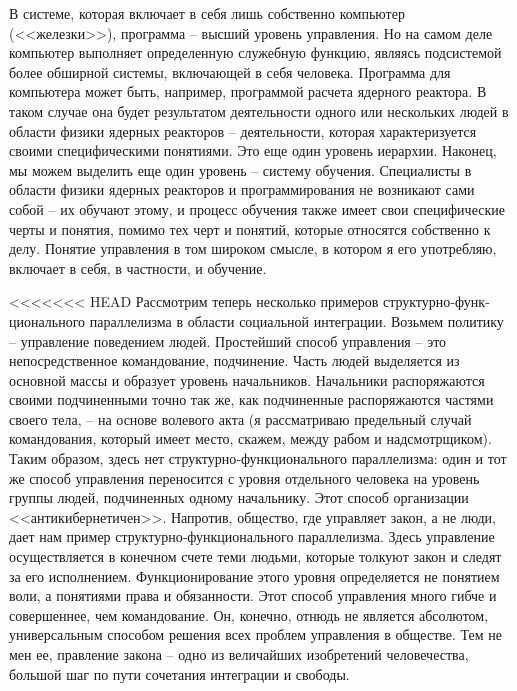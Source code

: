 \documentclass{book}
\begin{document}
В системе, которая включает в себя лишь собственно компьютер (<<железки>>), программа -- высший уровень управления. Но на самом деле компьютер выполняет определенную служебную функцию, являясь подсистемой более обширной системы, включающей в себя человека. Программа для компьютера может быть, например, программой расчета ядерного реактора. В таком случае она будет результатом деятельности одного или нескольких людей в области физики ядерных реакторов -- деятельности, которая характеризуется своими спе­цифическими понятиями. Это еще один уровень иерархии. На­конец, мы можем выделить еще один уровень -- систему обу­чения. Специалисты в области физики ядерных реакторов и про­граммирования не возникают сами собой -- их обучают этому, и процесс обучения также имеет свои специфические черты и понятия, помимо тех черт и понятий, которые относятся собст­венно к делу. Понятие управления в том широком смысле, в котором я его употребляю, включает в себя, в частности, и обучение.

<<<<<<< HEAD
Рассмотрим теперь несколько примеров структурно‑функ­ционального параллелизма в области социальной интеграции. Возьмем политику -- управление поведением людей. Простей­ший способ управления -- это непосредственное командование, подчинение. Часть людей выделяется из основной массы и обра­зует уровень начальников. Начальники распоряжаются своими подчиненными точно так же, как подчиненные распоряжаются частями своего тела, -- на основе волевого акта (я рассматри­ваю предельный случай командования, который имеет место, скажем, между рабом и надсмотрщиком). Таким образом, здесь нет структурно‑функционального параллелизма: один и тот же способ управления переносится с уровня отдельного че­ловека на уровень группы людей, подчиненных одному началь­нику. Этот способ организации <<антикибернетичен>>. Напротив, общество, где управляет закон,  а не люди,  дает нам пример структурно‑функционального параллелизма. Здесь управление осуществляется в конечном счете теми людьми, которые тол­куют закон и следят за его исполнением. Функционирование этого уровня определяется не понятием воли,  а понятиями права  и обязанности.  Этот способ управления много гибче и совер­шеннее, чем командование. Он, конечно, отнюдь не является абсолютом, универсальным способом решения всех проблем управления в обществе. Тем не мен ее, правление закона -- одно из величайших изобретений человечества, большой шаг по пу­ти сочетания интеграции и свободы.
\end{document}
